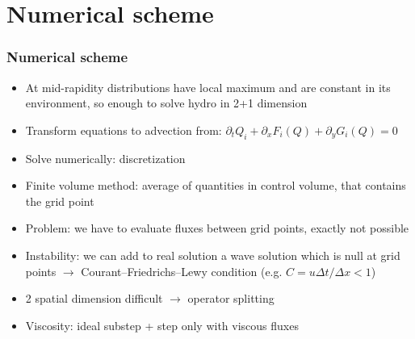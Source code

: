 \documentclass{beamer}
\begin{document}
\section{Numerical scheme}
\begin{frame}
\frametitle{Numerical scheme}
\begin{itemize}
\item At mid-rapidity distributions have local maximum and are constant in its environment, so enough to solve hydro in 2+1 dimension
\item Transform equations to advection from: $\partial_t Q_i+\partial_x F_i(Q)+\partial_y G_i(Q)=0$
\item Solve numerically: discretization
\item Finite volume method: average of quantities in control volume, that contains the grid point
\item Problem: we have to evaluate fluxes between grid points, exactly not possible 
\item Instability: we can add to real solution a wave solution which is null at grid points $\rightarrow$ Courant–Friedrichs–Lewy condition (e.g. $C=u\Delta t/ \Delta x < 1$)
\item 2 spatial dimension difficult $\rightarrow$ operator splitting
\item Viscosity: ideal substep + step only with viscous fluxes
\end{itemize}
\end{frame}
\end{document}
